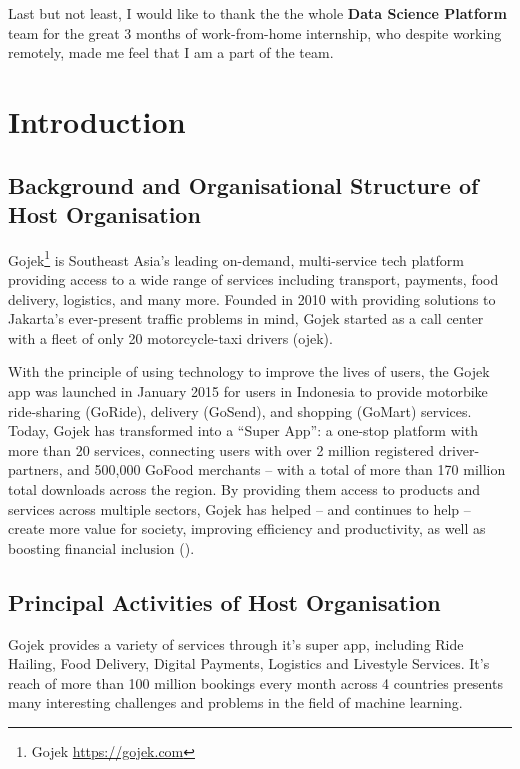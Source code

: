 \documentclass[a4paper, 12pt, fleqn]{report}
\begin{document}
Last but not least, I would like to thank the the whole \textbf{Data Science
  Platform} team for the great 3 months of work-from-home internship, who
despite working remotely, made me feel that I am a part of the team.

\singlespacing

\tableofcontents


\newpage


\chapter{Introduction}

\section{Background and Organisational Structure of Host Organisation}
Gojek\footnote{Gojek \url{https://gojek.com}} is Southeast Asia’s leading
on-demand, multi-service tech platform providing access to a wide range of
services including transport, payments, food delivery, logistics, and many more.
Founded in 2010 with providing solutions to Jakarta’s ever-present traffic
problems in mind, Gojek started as a call center with a fleet of only 20
motorcycle-taxi drivers (ojek). \newline

With the principle of using technology to improve the lives of users, the Gojek
app was launched in January 2015 for users in Indonesia to provide motorbike
ride-sharing (GoRide), delivery (GoSend), and shopping (GoMart) services. Today,
Gojek has transformed into a “Super App”: a one-stop platform with more than 20
services, connecting users with over 2 million registered driver-partners, and
500,000 GoFood merchants – with a total of more than 170 million total downloads
across the region. By providing them access to products and services across
multiple sectors, Gojek has helped – and continues to help – create more value
for society, improving efficiency and productivity, as well as boosting
financial inclusion (\cite{gojekhome}).
\newline

\section{Principal Activities of Host Organisation}
Gojek provides a variety of services through it's super app, including Ride
Hailing, Food Delivery, Digital Payments, Logistics and Livestyle Services. It's
reach of more than 100 million bookings every month across 4 countries presents
many interesting challenges and problems in the field of machine learning.
\newline
\end{document}
